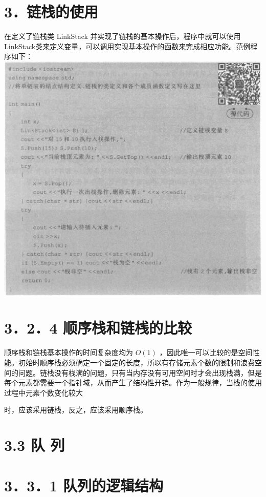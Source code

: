 \documentclass[10pt]{article}
\begin{document}
\section*{3．链栈的使用}
在定义了链栈类 LinkStack 并实现了链栈的基本操作后，程序中就可以使用 LinkStack类来定义变量，可以调用实现基本操作的函数来完成相应功能。范例程序如下：\\
\includegraphics[max width=\textwidth, center]{2025_06_06_704745ea57b15b2333e5g-090}

\section*{3．2．4 顺序栈和链桟的比较}
顺序栈和链栈基本操作的时间复杂度均为 $O(1)$ ，因此唯一可以比较的是空间性能。初始时顺序栈必须确定一个固定的长度，所以有存储元素个数的限制和浪费空间的问题。链栈没有栈满的问题，只有当内存没有可用空间时才会出现栈满，但是每个元素都需要一个指针域，从而产生了结构性开销。作为一般规律，当栈的使用过程中元素个数变化较大

时，应该采用链栈，反之，应该采用顺序栈。

\section*{3.3 队 列}
\section*{3．3．1 队列的逻辑结构}
\end{document}
